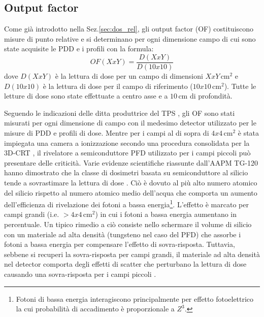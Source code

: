 \subsection{Output factor}
Come già introdotto nella Sez.\ref{sec:dos_rel}, gli output factor (OF) costituiscono misure di punto relative e si determinano per ogni dimensione campo di cui sono state acquisite le PDD e i profili con la formula:
\begin{equation}
\label{eq:OF}
OF(XxY)=\frac{D(XxY)}{D(10x10)}
\end{equation}
dove $D(XxY)$ è la lettura di dose per un campo di dimensioni $XxY\,$cm$^2$ e $D(10x10)$ è la lettura di dose per il campo di riferimento ($10x10\,$cm$^2$). Tutte le letture di dose sono state effettuate a centro asse e a $10\,$cm di profondità.

Seguendo le indicazioni delle ditta produttrice del TPS \cite{RaySearchLaboratories2014}, gli OF sono stati misurati per ogni dimensione di campo con il medesimo detector utilizzato per le misure di PDD e profili di dose. Mentre per i campi al di sopra di $4x4\,$cm$^2$ è stata impiegata una camera a ionizzazione secondo una procedura consolidata per la 3D-CRT \cite{Andreo2006}, il rivelatore a semiconduttore PFD utilizzato per i campi piccoli può presentare delle criticità. Varie evidenze scientifiche riassunte dall'AAPM TG-120 \cite{Low2011} hanno dimostrato che la classe di dosimetri basata su semiconduttore al silicio tende a sovrastimare la lettura di dose \cite{Low2011}. Ciò è dovuto al più alto numero atomico del silicio rispetto al numero atomico medio dell'acqua che comporta un aumento dell'efficienza di rivelazione dei fotoni a bassa energia\footnote{Fotoni di bassa energia interagiscono principalmente per effetto fotoelettrico la cui probabilità di accadimento è proporzionale a $Z^3$.}. L'effetto è marcato per campi grandi (i.e. $> 4x4\,$cm$^2$) in cui i fotoni a bassa energia aumentano in percentuale. Un tipico rimedio a ciò consiste nello schermare il volume di silicio con un materiale ad alta densità (tungsteno nel caso del PFD) che assorbe i fotoni a bassa energia per compensare l'effetto di sovra-risposta. Tuttavia, sebbene si recuperi la sovra-risposta per campi grandi, il materiale ad alta densità nel detector comporta degli effetti di scatter che perturbano la lettura di dose causando una sovra-risposta per i campi piccoli \cite{Griessbach2005}.


